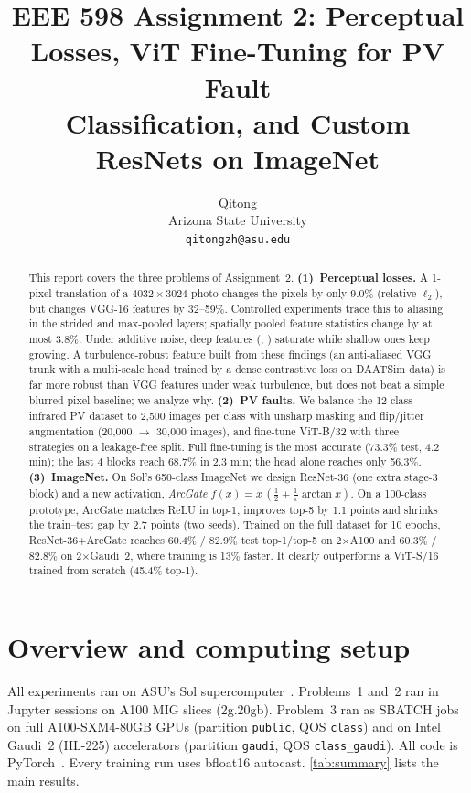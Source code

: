 \documentclass[10pt,twocolumn,letterpaper]{article}
\title{EEE 598 Assignment 2: Perceptual Losses, ViT Fine-Tuning for PV Fault\\ Classification, and Custom ResNets on ImageNet}
\author{Qitong \TODO{last name}\\
Arizona State University\\
{\tt\small qitongzh@asu.edu}
}
\begin{document}
\toggletrue{cvprfinal}\maketitle\togglefalse{cvprfinal}

\begin{abstract}
This report covers the three problems of Assignment~2.
\textbf{(1)~Perceptual losses.} A 1-pixel translation of a $4032{\times}3024$ photo changes the pixels by only 9.0\% (relative $\ell_2$), but changes VGG-16 features by 32--59\%. Controlled experiments trace this to aliasing in the strided and max-pooled layers; spatially pooled feature statistics change by at most 3.8\%. Under additive noise, deep features (, ) saturate while shallow ones keep growing. A turbulence-robust feature built from these findings (an anti-aliased VGG trunk with a multi-scale head trained by a dense contrastive loss on DAATSim data) is far more robust than VGG features under weak turbulence, but does not beat a simple blurred-pixel baseline; we analyze why.
\textbf{(2)~PV faults.} We balance the 12-class infrared PV dataset to 2{,}500 images per class with unsharp masking and flip/jitter augmentation (20{,}000 $\rightarrow$ 30{,}000 images), and fine-tune ViT-B/32 with three strategies on a leakage-free split. Full fine-tuning is the most accurate (73.3\% test, 4.2 min); the last 4 blocks reach 68.7\% in 2.3 min; the head alone reaches only 56.3\%.
\textbf{(3)~ImageNet.} On Sol's 650-class ImageNet we design ResNet-36 (one extra stage-3 block) and a new activation, \emph{ArcGate} $f(x)=x\,(\tfrac12+\tfrac1\pi\arctan x)$. On a 100-class prototype, ArcGate matches ReLU in top-1, improves top-5 by 1.1 points and shrinks the train--test gap by 2.7 points (two seeds). Trained on the full dataset for 10 epochs, ResNet-36+ArcGate reaches 60.4\% / 82.9\% test top-1/top-5 on 2$\times$A100 and 60.3\% / 82.8\% on 2$\times$Gaudi~2, where training is 13\% faster. It clearly outperforms a ViT-S/16 trained from scratch (45.4\% top-1).
\end{abstract}

\section{Overview and computing setup}
\label{sec:overview}
All experiments ran on ASU's Sol supercomputer~\cite{asurc2025sol}. Problems~1 and~2 ran in Jupyter sessions on A100 MIG slices (2g.20gb). Problem~3 ran as SBATCH jobs on full A100-SXM4-80GB GPUs (partition \texttt{public}, QOS \texttt{class}) and on Intel Gaudi~2 (HL-225) accelerators (partition \texttt{gaudi}, QOS \texttt{class\_gaudi}). All code is PyTorch~\cite{paszke2019pytorch}. Every training run uses bfloat16 autocast. \cref{tab:summary} lists the main results.
\end{document}
